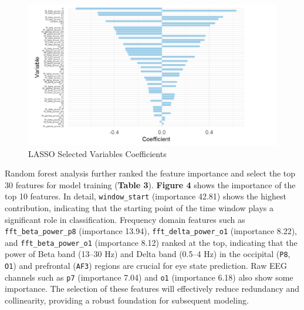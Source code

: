 \documentclass[
  doc]{apa6}
\begin{document}
\begin{figure}[H]

{\centering \includegraphics[width=1.2\linewidth]{figure/4} 

}

\caption{LASSO Selected Variables Coefficients}\label{fig:unnamed-chunk-3}
\end{figure}

Random forest analysis further ranked the feature importance and select the top 30 features for model training (\textbf{Table 3}). \textbf{Figure 4} shows the importance of the top 10 features. In detail, \texttt{window\_start} (importance 42.81) shows the highest contribution, indicating that the starting point of the time window plays a significant role in classification. Frequency domain features such as \texttt{fft\_beta\_power\_p8} (importance 13.94), \texttt{fft\_delta\_power\_o1} (importance 8.22), and \texttt{fft\_beta\_power\_o1} (importance 8.12) ranked at the top, indicating that the power of Beta band (13--30 Hz) and Delta band (0.5--4 Hz) in the occipital (\texttt{P8}, \texttt{O1}) and prefrontal (\texttt{AF3}) regions are crucial for eye state prediction. Raw EEG channels such as \texttt{p7} (importance 7.04) and \texttt{o1} (importance 6.18) also show some importance. The selection of these features will effectively reduce redundancy and collinearity, providing a robust foundation for subsequent modeling.
\end{document}
